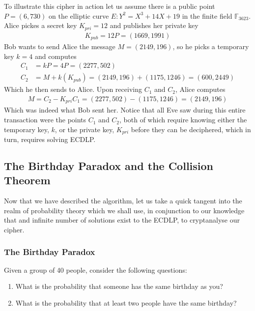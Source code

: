 \documentclass[12pt, a4paper, final]{report}
\begin{document}
To illustrate this cipher in action let us assume there is a public point
$P = (6, 730)$ on the elliptic curve $E:Y^2 = X^3 + 14X + 19$ in the finite
field $\mathds{F}_{3623}$. Alice pickes a secret key $K_{pri} = 12$ and
publishes her private key
\begin{align*}
    K_{pub} = 12P = (1669, 1991)
\end{align*}
Bob wants to send Alice the message $M = (2149, 196)$, so he picks a temporary
key $k = 4$ and computes
\begin{align*}
    C_1 &= kP = 4P = (2277, 502)\\
    C_2 &= M + k(K_{pub}) = (2149, 196) + (1175, 1246) = (600, 2449)
\end{align*}
Which he then sends to Alice. Upon receiving $C_1$ and $C_2$, Alice computes
\begin{align*}
    M = C_2 - K_{pri}C_1 = (2277, 502) - (1175, 1246) = (2149, 196)
\end{align*}
Which was indeed what Bob sent her. Notice that all Eve saw during this entire
transaction were the points $C_1$ and $C_2$, both of which require knowing
either the temporary key, $k$, or the private key, $K_{pri}$ before
they can be deciphered, which in turn, requires solving ECDLP.

\subsection{The Birthday Paradox and the Collision Theorem}

Now that we have described the algorithm, let us take a quick tangent into
the realm of probability theory which we shall use, in conjunction to our
knowledge that and infinite number of solutions exist to the ECDLP, to
cryptanalyse our cipher.

\subsubsection{The Birthday Paradox}

Given a group of 40 people, consider the following questions:

\begin{enumerate}
\item What is the probability that someone has the same birthday as you?
\item What is the probability that at least two people have the same birthday?
\end{enumerate}
\end{document}
